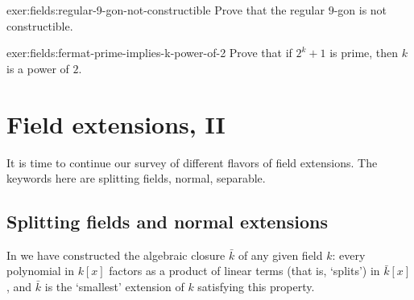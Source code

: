 \begin{exer}{}{exer:fields:regular-9-gon-not-constructible}
  Prove that the regular $9$-gon is not constructible.
\end{exer}

\begin{exer}{}{exer:fields:fermat-prime-implies-k-power-of-2}
  Prove that if $2^k + 1$ is prime, then $k$ is a power of $2$.
\end{exer}

\section{Field extensions, II}%
\label{sec:fields:field-extensions-ii}

It is time to continue our survey of different flavors of field
extensions. The keywords here are splitting fields, normal, separable.

\subsection{Splitting fields and normal extensions}%
\label{subsec:fields:splitting-fields-and-normal-extensions}
In
we have constructed the algebraic closure $\bar{k}$ of any given field
$k$: every polynomial in $k[x]$ factors as a product of linear terms
(that is, `splits') in $\bar{k}[x]$, and $\bar{k}$ is the `smallest'
extension of $k$ satisfying this property.

